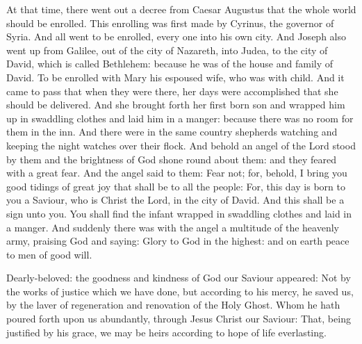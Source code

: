 \begin{multicols}{2}
At that time, there went out a decree from Caesar
Augustus that the whole world should be enrolled.  This enrolling was first
made by Cyrinus, the governor of Syria.  And all went to be enrolled, every one
into his own city.  And Joseph also went up from Galilee, out of the city of
Nazareth, into Judea, to the city of David, which is called Bethlehem: because
he was of the house and family of David.  To be enrolled with Mary his espoused
wife, who was with child.  And it came to pass that when they were there, her
days were accomplished that she should be delivered.  And she brought forth her
first born
son and wrapped him up in swaddling clothes and laid him in a manger: because
there was no room for them in the inn.  And there were in the same country
shepherds watching and keeping the night watches over their flock.  And behold
an angel of the Lord stood by them and the brightness of God shone round about
them: and they feared with a great fear.  And the angel said to them: Fear not;
for, behold, I bring you good tidings of great joy that shall be to all the
people: For, this day is born to you a Saviour, who is Christ the Lord, in the
city of David.  And this shall be a sign unto you. You shall find the infant
wrapped in swaddling clothes and laid in a manger.  And suddenly there was with
the angel a multitude of the heavenly army, praising God and saying: Glory to
God in the highest: and on earth peace to men of good will.






Dearly-beloved: the goodness and kindness of God our Saviour appeared: Not by the
works of justice which we have done, but according to his mercy, he saved us,
by the laver of regeneration and renovation of the Holy Ghost.  Whom he hath
poured forth upon us abundantly, through Jesus Christ our Saviour: That, being
justified by his grace, we may be heirs according to hope of life everlasting.




\end{multicols}
